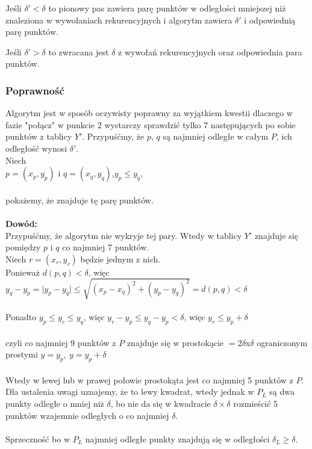\begin{itemize}
		Jeśli $\delta'<\delta$ to pionowy pas zawiera parę punktów w odległości mniejszej niż znaleziona w  wywołaniach rekurencyjnych i algorytm zawiera $\delta'$ i odpowiednią parę punktów.
		
		Jeśli $\delta'>\delta$ to zwracana jest $\delta$ z wywołań rekurencyjnych oraz odpowiednia para punktów.
\end{itemize}

\subsubsection{Poprawność}
Algorytm jest w sposób oczywisty poprawny za wyjątkiem kwestii dlaczego w fazie "połącz" w punkcie 2 wystarczy sprawdzić tylko 7 następujących po sobie punktów z tablicy $Y'$. Przypuśćmy, że $p$, $q$ są najmniej odległe w całym $P$, ich odległość wynosi $\delta'$.\\
Niech \\
\tab $p=(x_p,y_p)$ i $q=(x_q,y_q)$,\tab \tab $y_p\leq y_q$,\\
\\
pokażemy, że znajduje tę parę punktów.\\
\\
\textbf{Dowód: }\\
Przypuśćmy, że algorytm nie wykryje tej pary. Wtedy w tablicy $Y'$ znajduje się pomiędzy $p$ i $q$ co najmniej 7 punktów.\\
Niech $r=(x_r,y_r)$ będzie jednym z nich.\\
Ponieważ $d(p,q)<\delta$, więc $y_q-y_p = \vert y_p - y_q \vert \leq \sqrt{(x_p-x_q)^2+(y_p-y_q)^2}=d(p,q)<\delta$\\
\\
Ponadto $y_p\leq y_c\leq y_q$, więc $y_r-y_p \leq y_q-y_p<\delta$, więc $y_r\leq y_p + \delta$\\
\\
czyli co najmniej 9 punktów z $P$ znajduje się w prostokącie $=2\delta$x$\delta$ ograniczonym prostymi $y=y_p,\ y=y_p+\delta$\\
\\
Wtedy w lewej lub w prawej połowie prostokąta jest co najmniej 5 punktów z $P$. Dla ustalenia uwagi uznajemy, że to lewy kwadrat, wtedy jednak w $P_L$ są dwa punkty odległe o mniej niż $\delta$, bo nie da się w kwadracie $\delta \times \delta$ rozmieścić 5 punktów wzajemnie odległych o co najmniej $\delta$.\\
\\
Sprzeczność bo w $P_L$ najmniej odległe punkty znajdują się w odległości $\delta_L \geq \delta$.

